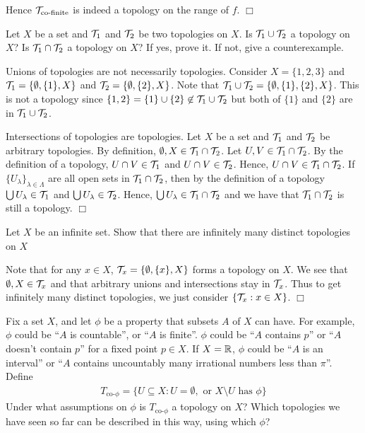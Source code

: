 \documentclass{article}
\begin{document}
\begin{spacedenumerate}
    Hence $\mathcal{T}_{\text{co-finite}}$ is indeed a topology on the range of $f$. $\Box$

    \item Let $X$ be a set and $\mathcal{T}_{1}$ and $\mathcal{T}_{2}$ be two topologies on $X$. Is $\mathcal{T}_{1}\cup \mathcal{T}_{2}$ a topology on $X$? Is $\mathcal{T}_{1}\cap \mathcal{T}_{2}$ a topology on $X$? If yes, prove it. If not, give a counterexample.
    
    Unions of topologies are not necessarily topologies. Consider $X = \{1, 2, 3\}$ and $\mathcal{T}_{1} = \{\emptyset, \{1\}, X\}$ and $\mathcal{T}_{2} = \{\emptyset, \{2\}, X\}$. Note that $\mathcal{T}_{1} \cup \mathcal{T}_{2} = \{\emptyset, \{1\}, \{2\}, X\}$. This is not a topology since $\{1,2\} = \{1\}\cup \{2\} \not\in\mathcal{T}_{1} \cup \mathcal{T}_{2}  $ but both of $\{1\}$ and $\{2\}$ are in $\mathcal{T}_{1} \cup \mathcal{T}_{2}$. 

    Intersections of topologies are topologies. Let $X$ be a set and $\mathcal{T}_{1}$ and $\mathcal{T}_{2}$ be arbitrary topologies. By definition, $\emptyset, X\in \mathcal{T}_{1}\cap \mathcal{T}_{2}$. Let $U,V\in \mathcal{T}_{1}\cap \mathcal{T}_{2}$. By the definition of a topology, $U\cap V \in \mathcal{T}_{1}$ and $U\cap V \in \mathcal{T}_{2}$. Hence, $U\cap V\in \mathcal{T}_{1}\cap \mathcal{T}_{2}$. If $\{U_{\lambda}\}_{\lambda\in \Lambda}$ are all open sets in $\mathcal{T}_{1}\cap\mathcal{T}_{2}$, then by the definition of a topology $\bigcup U_{\lambda}\in \mathcal{T}_{1}$ and $\bigcup U_{\lambda}\in \mathcal{T}_{2}$. Hence, $\bigcup U_{\lambda}\in \mathcal{T}_{1}\cap\mathcal{T}_{2}$ and we have that $\mathcal{T}_{1}\cap \mathcal{T}_{2}$ is still a topology. $\Box$
    \item Let $X$ be an infinite set. Show that there are infinitely many distinct topologies on $X$
    
    Note that for any $x\in X$, $\mathcal{T}_{x} = \{\emptyset, \{x\}, X\}$ forms a topology on $X$. We see that $\emptyset, X\in \mathcal{T}_{x}$ and that arbitrary unions and intersections stay in $\mathcal{T}_{x}$. Thus to get infinitely many distinct topologies, we just consider $\{\mathcal{T}_{x}: x\in X\}$. $\Box$
    \item Fix a set $X$, and let $\phi$ be a property that subsets $A$ of $X$ can have. For example, $\phi$ could be “$A$ is countable”, or “$A$ is finite”. $\phi$ could be “$A$ contains $p$” or “$A$ doesn't contain $p$” for a fixed point $p \in X$. If $X = \mathbb{R}$, $\phi$ could be “$A$ is an interval” or “$A$ contains uncountably many irrational numbers less than $\pi$”. Define
    \begin{align*}
        T_{\text{co-}\phi} = \{U \subseteq X : U = \emptyset, \text{ or } X \setminus U\text{ has }\phi\}
    \end{align*}
    Under what assumptions on $\phi$ is $T_{\text{co-}\phi} $ a topology on $X$? Which topologies we have seen so far can be described in this way, using which $\phi$?


\end{spacedenumerate}
\end{document}
